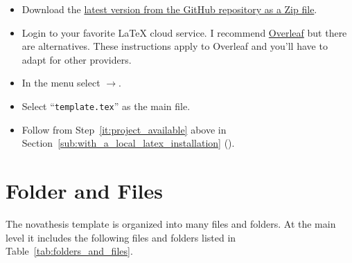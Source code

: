 \begin{itemize}
  \item Download the \href{https://github.com/joaomlourenco/novathesis/archive/main.zip}{latest version from the GitHub repository as a Zip file}.
  \item Login to your favorite LaTeX cloud service. I recommend \href{https://www.overleaf.com/?r=f5160636&rm=d&rs=b}{Overleaf} but there are alternatives. These instructions apply to Overleaf and you'll have to adapt for other providers.
  \item In the menu select $\rightarrow$.
  \item Select “\verb!template.tex!” as the main file.
  \item Follow from Step~\ref{it:project_available} above in Section~\ref{sub:with_a_local_latex_installation} ().
\end{itemize}



\section{Folder and Files}
\label{sec:folders_and_files}

The \gls{novathesis} template is organized into many files and folders. At the main level it includes the following files and folders listed in Table~\ref{tab:folders_and_files}.

\newcommand{\accessAllowed}{\texttt{[image: access\_allowed]}}
\newcommand{\accessForbiden}{\texttt{[image: dont\_touch]}}
\newcommand{\File}{\texttt{[image: file]}}
\newcommand{\Folder}{\texttt{[image: folder]}}


